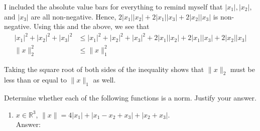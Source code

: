 \documentclass[11pt]{amsart}
\begin{document}
{\begin{enumerate}
{I included the absolute value bars for everything to remind myself that $|x_1|, |x_2|,$ and $|x_3|$ are all non-negative. Hence, $2|x_1||x_2| + 2|x_1||x_3| + 2|x_2||x_3|$ is non-negative. Using this and the above, we see that 
\begin{align} \nonumber
|x_1|^2 + |x_2|^2 + |x_3|^2 &\leq |x_1|^2 + |x_2|^2 + |x_3|^2 + 2|x_1||x_2| + 2|x_1||x_3| + 2|x_2||x_3| \\ \nonumber
\|x\|_2^2 &\leq \|x\|_1^2
\end{align}

Taking the square root of both sides of the inequality shows that $\|x\|_2$ must be less than or equal to $\|x\|_1$ as well.
\bigskip

\item[Problem 7:] Determine whether each of the following functions is a norm. Justify your answer. \\

\begin{enumerate}
\item $x\in \mathbb{R}^3$, $\|x\| = 4|x_1| + |x_1 - x_2 +x_3| + |x_2+x_3|$.\\
Answer:


\end{enumerate}}
\end{enumerate}}
\end{document}
